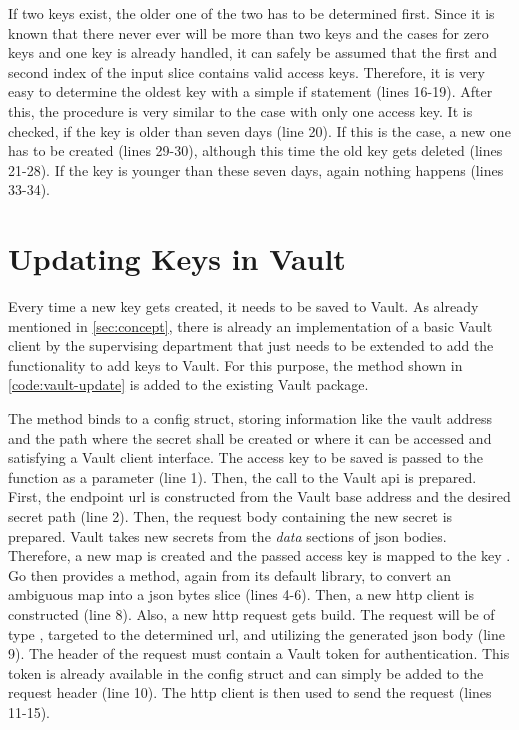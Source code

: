 If two keys exist, the older one of the two has to be determined first.
Since it is known that there never ever will be more than two keys and the cases for zero keys and one key is already handled, it can safely be assumed that the first and second index of the input slice contains valid access keys.
Therefore, it is very easy to determine the oldest key with a simple if statement (lines 16-19).
After this, the procedure is very similar to the case with only one access key.
It is checked, if the key is older than seven days (line 20).
If this is the case, a new one has to be created (lines 29-30), although this time the old key gets deleted (lines 21-28).
If the key is younger than these seven days, again nothing happens (lines 33-34).



\section{Updating Keys in Vault}
Every time a new key gets created, it needs to be saved to Vault.
As already mentioned in \autoref{sec:concept}, there is already an implementation of a basic Vault client by the supervising department that just needs to be extended to add the functionality to add keys to Vault.
For this purpose, the method shown in \autoref{code:vault-update} is added to the existing Vault package.

The method binds to a config struct, storing information like the vault address and the path where the secret shall be created or where it can be accessed and satisfying a Vault client interface.
The access key to be saved is passed to the function as a parameter (line 1).
Then, the call to the Vault \ac{api} is prepared.
First, the endpoint \ac{url} is constructed from the Vault base address and the desired secret path (line 2).
Then, the request body containing the new secret is prepared.
Vault takes new secrets from the \emph{data} sections of \ac{json} bodies.
Therefore, a new map is created and the passed access key is mapped to the key .
Go then provides a method, again from its default library, to convert an ambiguous map into a \ac{json} bytes slice (lines 4-6).
Then, a new \ac{http} client is constructed (line 8).
Also, a new \ac{http} request gets build.
The request will be of type , targeted to the determined \ac{url}, and utilizing the generated \ac{json} body (line 9).
The header of the request must contain a Vault token for authentication.
This token is already available in the config struct and can simply be added to the request header (line 10).
The \ac{http} client is then used to send the request (lines 11-15).


